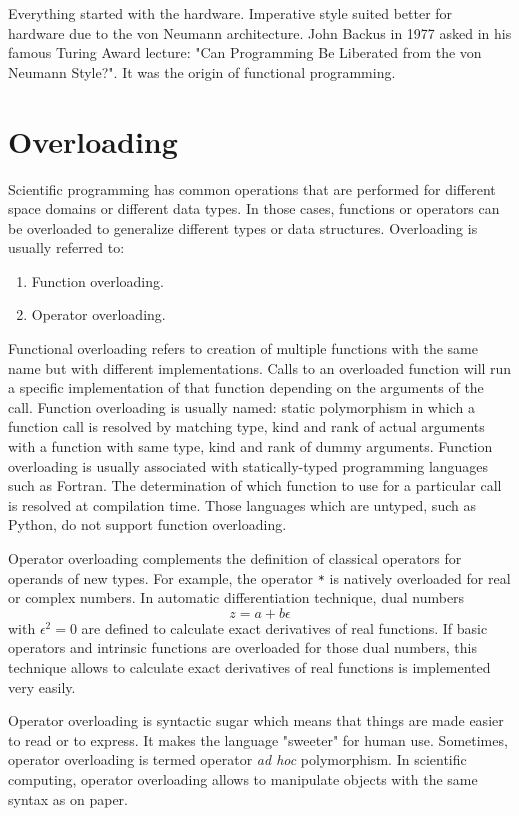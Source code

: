 Everything started with the hardware.
Imperative style suited better for hardware due to the von Neumann architecture. 
John Backus in 1977 asked in his famous Turing Award lecture:
 "Can Programming Be Liberated from the von Neumann Style?". 
 It was the origin of functional programming. 


\newpage 
    \section{Overloading} 
Scientific programming has common operations that are performed for different 
space domains or different data types. In those cases, functions or operators can be  overloaded 
to generalize different types or data structures.  
Overloading is usually referred to:  
\begin{enumerate}
\item Function overloading.
\item Operator overloading.
\end{enumerate}
Functional overloading refers to creation of multiple functions with the same name but with different implementations. 
Calls to an overloaded function will run a 
specific implementation of that function depending on the arguments of the call. 
Function overloading is usually named: static polymorphism in which a function call is resolved by matching 
type, kind and rank of actual arguments with a function with same type, kind and rank of dummy arguments.
Function overloading is usually associated with statically-typed programming languages such as Fortran. 
The determination of which function to use for a particular call is resolved at compilation time.
Those languages which are untyped, such as Python, do not support function overloading. 


Operator overloading complements the definition of classical operators for operands of new types. 
For example, the operator \verb|*| is natively overloaded for real or complex numbers. 
In automatic differentiation technique, dual numbers 
$$ z = a + b \epsilon
$$ 
with $\epsilon^2=0$ 
are defined to calculate exact derivatives of real functions. 
If basic operators and intrinsic functions are overloaded for those dual numbers, 
this technique allows to calculate 
exact derivatives of real functions is implemented very easily. 

Operator overloading is syntactic sugar which means that things are made easier to read or to express.
It makes the language "sweeter" for human use.
Sometimes, operator overloading is termed operator {\it ad hoc} polymorphism.
In scientific computing, operator overloading allows to manipulate objects with the same syntax as on paper.



